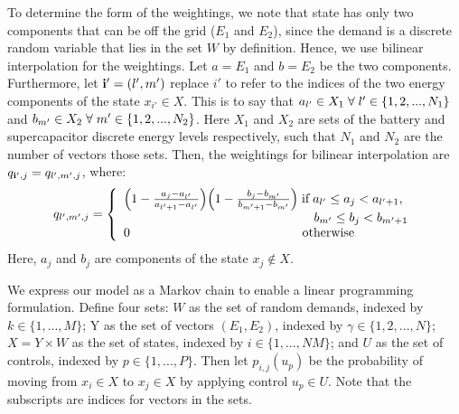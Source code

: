 \documentclass[conference]{IEEEtran}
\begin{document}
To determine the form of the weightings, we note that  state has only two components that can be off the grid ($E_{1}$ and $E_{2}$), since the demand is a discrete random variable that lies in the set $W$ by definition. Hence, we use bilinear interpolation for the weightings. Let $a=E_{1}$ and $b=E_{2}$ be the two components. Furthermore, let $\bold{i'}=(l',m')$ replace $i'$ to refer to the indices of the two energy components of the state $x_{i'}\in X$. This is to say that $a_{l'}\in X_{1}\hspace{0.1cm}\forall\hspace{0.1cm}l'\in\{1,2,..., N_{1}\}$ and $b_{m'}\in X_{2}\hspace{0.1cm}\forall\hspace{0.1cm} m'\in\{1,2,..., N_{2}\}$. Here $X_{1}$ and $X_{2}$ are sets of the battery and supercapacitor discrete energy levels respectively, such that $N_{1}$ and $N_{2}$ are the number of vectors those sets. Then, the weightings for bilinear interpolation are $q_{\bold{i'},j}=q_{l',m',j}$, where:
\begin{displaymath}q_{l',m',j}=
\left\{
\begin{array}{l}
\Big(1-\frac{a_{j}-a_{l'}}{a_{l'+1}-a_{l'}}\Big)\Big(1-\frac{b_{j}-b_{m'}}{b_{m'+1}-b_{m'}}\Big)\hspace{0.1cm} \text{if} \hspace{0.1cm} a_{l'}\leq a_{j}< a_{l'+1},\\ \hspace{5.3cm}b_{m'}\leq b_{j}< b_{m'+1}\\
0		   \hspace{4.8cm} \text{otherwise}
\end{array}
\right.
\end{displaymath} Here, $a_{j}$ and $b_{j}$ are components of the state $x_{j}\not\in X$.

We express our model as a Markov chain to enable a linear programming formulation. Define four sets: $W$ as the set of random demands, indexed by $k\in\{1,...,M\}$; Y as the set of vectors $(E_{1},E_{2})$, indexed by $\gamma \in\{1,2,...,N\}$; $X=Y\times W$ as the set of states, indexed by $i\in\{1,...,NM\}$; and $U$ as the set of controls, indexed by $p\in\{1,...,P\}$. Then let $p_{i,j}(u_{p})$ be the probability of moving from $x_{i}\in X$ to $x_{j}\in X$ by applying control $u_{p}\in U$. Note that the subscripts are indices for vectors in the sets. 
\end{document}
